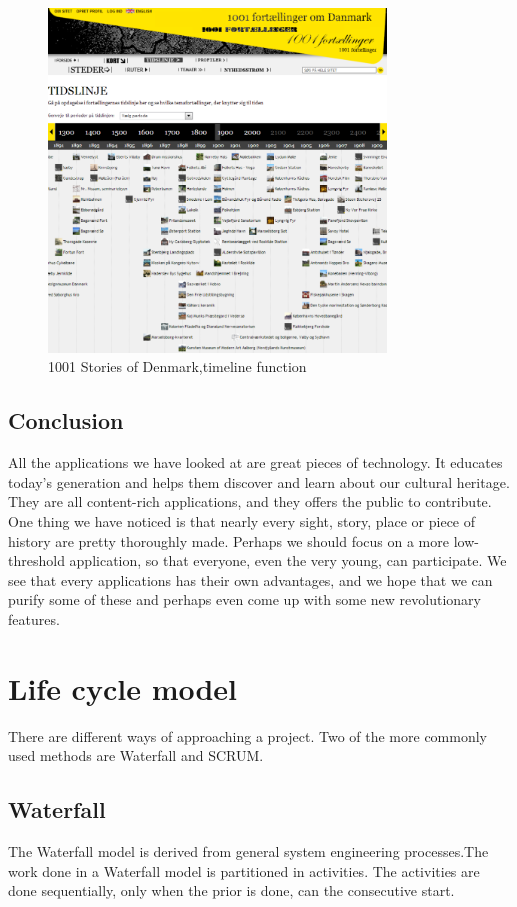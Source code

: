 \documentclass[11pt]{book}
\begin{document}
\begin{figure}[H]
      \centering
      \includegraphics[width=0.8\textwidth]{Figures/Prestudy/1001storiesWebsiteTimeline.png}
      \caption{1001 Stories of Denmark,timeline function}
      \label{fig:pre_1001StoriesDenmarkTimeLine}
\end{figure}

\subsection{Conclusion}
All the applications we have looked at are great pieces of technology. It educates today's generation and helps them discover and learn about our cultural heritage. They are all content-rich applications, and they offers the public to contribute. One thing we have noticed is that nearly every sight, story, place or piece of history are pretty thoroughly made. Perhaps we should focus on a more low-threshold application, so that everyone, even the very young, can participate.
We see that every applications has their own advantages, and we hope that we can purify some of these and perhaps even come up with some new revolutionary features.


\section{Life cycle model}
There are different ways of approaching a project. Two of the more commonly used methods are Waterfall and SCRUM.

\subsection{Waterfall}
The Waterfall model \cite[p. 30-32]{Sommerville10} is derived from general system engineering processes.The work done in a Waterfall model is partitioned in activities. The activities are done sequentially, only when the prior is done, can the consecutive start.
\end{document}
